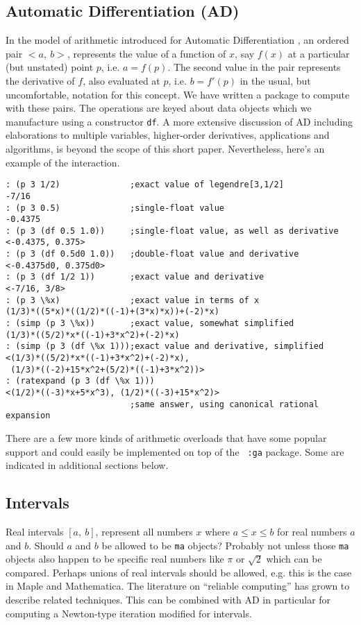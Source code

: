 \documentclass{article}
\begin{document}
{{\subsection*{Automatic Differentiation (AD)}
In the model of arithmetic introduced for Automatic Differentiation
\cite{Griewank89,Griewank91}, an ordered pair $<a,~ b>$, represents
the value of a function of $x$, say $f(x)$ at a particular (but
unstated) point $p$, i.e. $a=f(p)$. The second value in the pair
represents the derivative of $f$, also evaluated at $p$,
i.e. $b=f'(p)$ in the usual, but uncomfortable, notation for this
concept.  We have written a package to compute with these pairs. The
operations are keyed about data objects which we manufacture using a
constructor {\tt df}.  A more extensive discussion of AD including
elaborations to multiple variables, higher-order derivatives,
applications and algorithms, is beyond the scope of this short
paper. Nevertheless, here's an example of the interaction.
\begin{verbatim}
: (p 3 1/2)              ;exact value of legendre[3,1/2]
-7/16
: (p 3 0.5)              ;single-float value
-0.4375
: (p 3 (df 0.5 1.0))     ;single-float value, as well as derivative
<-0.4375, 0.375>
: (p 3 (df 0.5d0 1.0))   ;double-float value and derivative
<-0.4375d0, 0.375d0>
: (p 3 (df 1/2 1))       ;exact value and derivative
<-7/16, 3/8>
: (p 3 \%x)              ;exact value in terms of x
(1/3)*((5*x)*((1/2)*((-1)+(3*x)*x))+(-2)*x)
: (simp (p 3 \%x))       ;exact value, somewhat simplified
(1/3)*((5/2)*x*((-1)+3*x^2)+(-2)*x)
: (simp (p 3 (df \%x 1)));exact value and derivative, simplified
<(1/3)*((5/2)*x*((-1)+3*x^2)+(-2)*x), 
 (1/3)*((-2)+15*x^2+(5/2)*((-1)+3*x^2))>
: (ratexpand (p 3 (df \%x 1))) 
<(1/2)*((-3)*x+5*x^3), (1/2)*((-3)+15*x^2)>
                         ;same answer, using canonical rational expansion
\end{verbatim}
There are a few more kinds of arithmetic overloads that have some
popular support and could easily be implemented on top of the {\tt
:ga} package. Some are indicated in additional sections below.
\subsection*{Intervals}
Real intervals $[a,~ b]$, represent all numbers $x$ where $a \le x \le
b$ for real numbers $a$ and $b$. Should $a$ and $b$ be allowed to be
{\tt ma} objects? Probably not unless those {\tt ma} objects also
happen to be specific real numbers like $\pi$ or $\sqrt{2}$ which
can be compared.  Perhaps unions of real intervals
should be allowed, e.g. this is the case in Maple and Mathematica. 
The literature on ``reliable computing'' has grown to describe related
techniques.
This can be combined with AD in particular for
computing a Newton-type iteration modified for intervals.

}}
\end{document}
